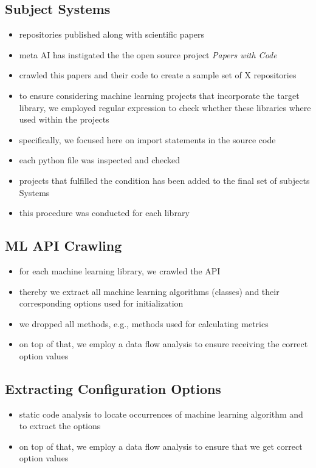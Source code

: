 \documentclass[sigconf,review,anonymous]{acmart}
\begin{document}
\subsection{Subject Systems}
\begin{itemize}
    \item repositories published along with scientific papers
    \item meta AI has instigated the the open source project \emph{Papers with Code}
    \item crawled this papers and their code to create a sample set of X repositories
    \item to ensure considering machine learning projects that incorporate the target library, we employed regular expression to check whether these libraries where used within the projects
    \item specifically, we focused here on import statements in the source code
    \item each python file was inspected and checked
    \item projects that fulfilled the condition has been added to the final set of subjects Systems
    \item this procedure was conducted for each library
\end{itemize}

\subsection{ML API Crawling}
\begin{itemize}
    \item for each machine learning library, we crawled the API
    \item thereby we extract all machine learning algorithms (classes) and their corresponding options used for initialization
    \item we dropped all methods, e.g., methods used for calculating metrics
    \item on top of that, we employ a data flow analysis to ensure receiving the correct option values
\end{itemize}

\subsection{Extracting Configuration Options}
\begin{itemize}
    \item static code analysis to locate occurrences of machine learning algorithm and to extract the options
    \item on top of that, we employ a data flow analysis to ensure that we get correct option values
\end{itemize}
\end{document}
